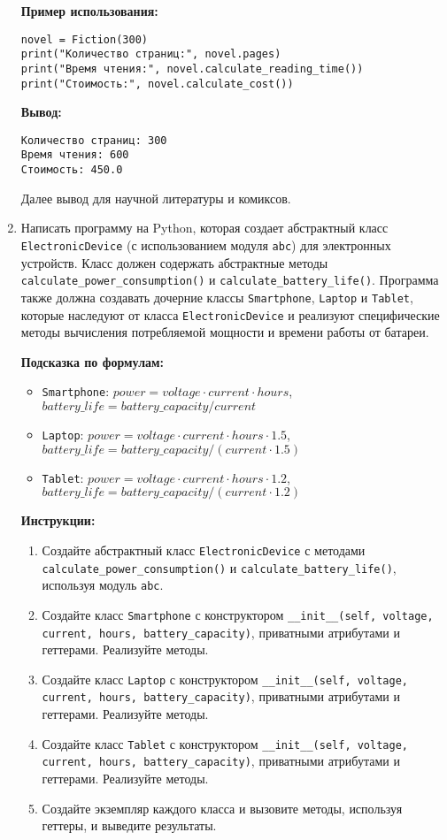 \begin{enumerate}
\textbf{Пример использования:}
\begin{verbatim}
novel = Fiction(300)
print("Количество страниц:", novel.pages)
print("Время чтения:", novel.calculate_reading_time())
print("Стоимость:", novel.calculate_cost())
\end{verbatim}

\textbf{Вывод:}
\begin{verbatim}
Количество страниц: 300
Время чтения: 600
Стоимость: 450.0
\end{verbatim}

Далее вывод для научной литературы и комиксов.

\item
Написать программу на Python, которая создает абстрактный класс \texttt{ElectronicDevice} (с использованием модуля \texttt{abc}) для электронных устройств. 
Класс должен содержать абстрактные методы \texttt{calculate\_power\_consumption()} и \texttt{calculate\_battery\_life()}. 
Программа также должна создавать дочерние классы \texttt{Smartphone}, \texttt{Laptop} и \texttt{Tablet}, 
которые наследуют от класса \texttt{ElectronicDevice} и реализуют специфические методы вычисления потребляемой мощности и времени работы от батареи.

\textbf{Подсказка по формулам:}
\begin{itemize}
    \item \texttt{Smartphone}: $power = voltage \cdot current \cdot hours$, $battery\_life = battery\_capacity / current$
    \item \texttt{Laptop}: $power = voltage \cdot current \cdot hours \cdot 1.5$, $battery\_life = battery\_capacity / (current \cdot 1.5)$
    \item \texttt{Tablet}: $power = voltage \cdot current \cdot hours \cdot 1.2$, $battery\_life = battery\_capacity / (current \cdot 1.2)$
\end{itemize}

\textbf{Инструкции:}
\begin{enumerate}
    \item Создайте абстрактный класс \texttt{ElectronicDevice} с методами \texttt{calculate\_power\_consumption()} и \texttt{calculate\_battery\_life()}, используя модуль \texttt{abc}.
    \item Создайте класс \texttt{Smartphone} с конструктором \texttt{\_\_init\_\_(self, voltage, current, hours, battery\_capacity)}, приватными атрибутами и геттерами. Реализуйте методы.
    \item Создайте класс \texttt{Laptop} с конструктором \texttt{\_\_init\_\_(self, voltage, current, hours, battery\_capacity)}, приватными атрибутами и геттерами. Реализуйте методы.
    \item Создайте класс \texttt{Tablet} с конструктором \texttt{\_\_init\_\_(self, voltage, current, hours, battery\_capacity)}, приватными атрибутами и геттерами. Реализуйте методы.
    \item Создайте экземпляр каждого класса и вызовите методы, используя геттеры, и выведите результаты.
\end{enumerate}


\end{enumerate}
